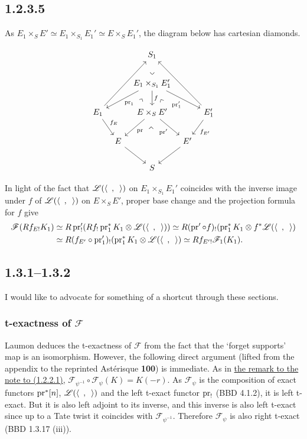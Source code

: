 \documentclass[deligne.tex]{subfiles}
\begin{document}
\subsection*{1.2.3.5} As
$E_1\times_S E'\simeq E_1\times_{S_1}E_1'\simeq E\times_S E_1'$, the diagram
below has cartesian diamonds.
\begin{ceqn}\begin{equation*}\begin{tikzcd}[column sep=tiny]
	&&S_1 \\
	&&E_1\times_{S_1}E_1'\arrow[dll,"\pr_1"]\arrow[drr,"\pr'_1"']\arrow[d,"f"]
	\arrow[ddl,phantom,"{\rotatebox{15}{\text{$\urcorner$}}}",near start]
	\arrow[ddr,phantom,"{\rotatebox{75}{\text{$\urcorner$}}}",near start]
	\arrow[u,phantom,"{\rotatebox{45}{\text{$\llcorner$}}}",near start] \\
	E_1\arrow[dr,"f_E"]\arrow[uurr]
	&&E\times_SE'\arrow[dl,"\pr"]\arrow[dr,"\pr'"'] 	\arrow[dd,phantom,"{\rotatebox{45}{\text{$\urcorner$}}}",near start]
	&&E_1'\arrow[dl,"f_{E'}"]\arrow[uull] \\
	&E\arrow[dr]&&E'\arrow[dl] \\ &&S
\end{tikzcd}\end{equation*}\end{ceqn}
In light of the fact that $\mathscr L(\langle\enskip,\enskip\rangle)$ on
$E_1\times_{S_1}E_1'$ coincides with the inverse image under $f$ of
$\mathscr L(\langle\enskip,\enskip\rangle)$ on $E\times_SE'$,
proper base change and the projection formula for $f$ give
\begin{align*}
	\mathscr F(Rf_{E!}K_1)
	&\simeq R\operatorname{pr}'_!(Rf_!\operatorname{pr}_1^*K_1\otimes\mathscr L(\langle\enskip,\enskip\rangle))
	\simeq R(\operatorname{pr}'\circ f)_!(\operatorname{pr}_1^*K_1\otimes f^*\mathscr L(\langle\enskip,\enskip\rangle) \\
	&\simeq R(f_{E'}\circ\operatorname{pr}_1')_!(\operatorname{pr}_1^*K_1\otimes \mathscr L(\langle\enskip,\enskip\rangle)
	\simeq Rf_{E'!}\mathscr F_1(K_1).
\end{align*}

\subsection*{1.3.1–1.3.2}
I would like to advocate for something of a shortcut through these sections.
\subsubsection*{t-exactness of $\mathscr F$}
Laumon deduces the t-exactness of $\mathscr F$ from the fact that the
`forget supports' map is an isomorphism. However, the following direct
argument (lifted from the appendix to the reprinted 
Astérisque \textbf{100}) is immediate.
As in \hyperref[laumon:1.2.2.1rmk]{the remark to the note to (1.2.2.1)},
$\mathscr F_{\psi^{-1}}\circ\mathscr F_{\psi}(K)=K(-r)$.
As $\mathscr F_{\psi}$ is the composition of exact functors $\operatorname{pr}^*[n]$,
$\mathscr L(\langle\enskip,\enskip\rangle)$ and the left t-exact functor
$\operatorname{pr}_!$ (BBD 4.1.2), it is left t-exact. But it is also left adjoint to
its inverse, and this inverse is also left t-exact since up to a Tate twist
it coincides with $\mathscr F_{\psi^{-1}}$. Therefore $\mathscr F_{\psi}$ is
also right t-exact (BBD 1.3.17 (iii)).
\end{document}
